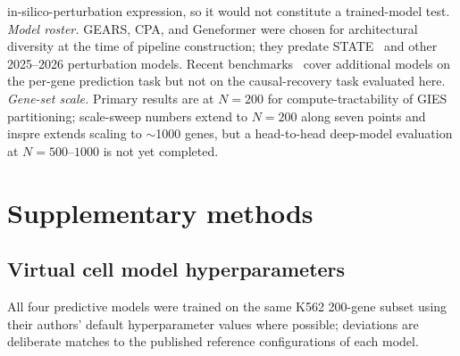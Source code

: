 \documentclass{article}
\theoremstyle{plain}
\theoremstyle{definition}
\theoremstyle{remark}
\begin{document}
in-silico-perturbation expression, so it would not constitute a trained-model test. \textit{Model roster.} GEARS, CPA, and Geneformer were chosen for architectural diversity at the time of pipeline construction; they predate STATE~\citep{adduri2025state,arc2025state} and other 2025--2026 perturbation models. Recent benchmarks~\citep{wong2025simple,csendes2025benchmark,wei2025benchmark,vinas2025systema} cover additional models on the per-gene prediction task but not on the causal-recovery task evaluated here. \textit{Gene-set scale.} Primary results are at $N=200$ for compute-tractability of GIES partitioning; scale-sweep numbers extend to $N=200$ along seven points and inspre extends scaling to $\sim$1000 genes, but a head-to-head deep-model evaluation at $N=500$--$1000$ is not yet completed.

\section{Supplementary methods}
\label{app:supp_methods}

\subsection{Virtual cell model hyperparameters}
\label{app:hparams}

All four predictive models were trained on the same K562 200-gene subset using their authors' default hyperparameter values where possible; deviations are deliberate matches to the published reference configurations of each model.
\end{document}
